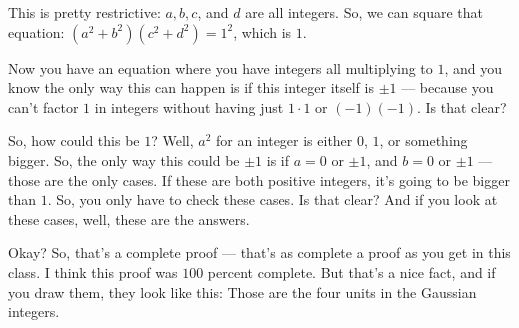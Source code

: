\begin{speech}[00:03:55 - 00:05:14]
This is pretty restrictive: $a, b, c$, and $d$ are all integers. So, we can square that equation:  $(a^2 + b^2)(c^2 + d^2) = 1^2$, which is $1$.

Now you have an equation where you have integers all multiplying to $1$, and you know the only way this can happen is if this integer itself is $\pm 1$ --- because you can't factor $1$ in integers without having just $1 \cdot 1$ or $(-1)(-1)$. Is that clear?

So, how could this be $1$? Well, $a^2$ for an integer is either $0$, $1$, or something bigger. So, the only way this could be $\pm 1$ is if $a = 0$ or $\pm 1$, and $b = 0$ or $\pm 1$  --- those are the only cases. If these are both positive integers, it's going to be bigger than $1$. So, you only have to check these cases. Is that clear? And if you look at these cases, well, these are the answers. 

Okay? So, that's a complete proof --- that's as complete a proof as you get in this class. I think this proof was $100$ percent complete. But that's a nice fact, and if you draw them, they look like this:  Those are the four units in the Gaussian integers.
\end{speech}

